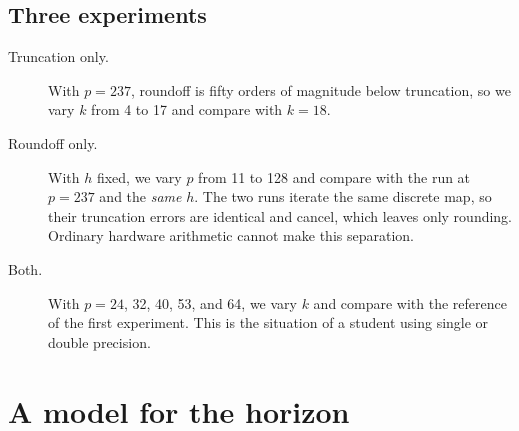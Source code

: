\documentclass[12pt,a4paper]{article}
\begin{document}
\subsection{Three experiments}

\begin{description}
\item[Truncation only.] With $p=237$, roundoff is fifty orders of magnitude
below truncation, so we vary $k$ from 4 to 17 and compare with $k=18$.
\item[Roundoff only.] With $h$ fixed, we vary $p$ from 11 to 128 and compare
with the run at $p=237$ and the \emph{same} $h$. The two runs iterate the same
discrete map, so their truncation errors are identical and cancel, which leaves
only rounding. Ordinary hardware arithmetic cannot make this separation.
\item[Both.] With $p=24$, 32, 40, 53, and 64, we vary $k$ and compare with the
reference of the first experiment. This is the situation of a student using
single or double precision.
\end{description}

\section{A model for the horizon}
\label{sec:model}
\end{document}
